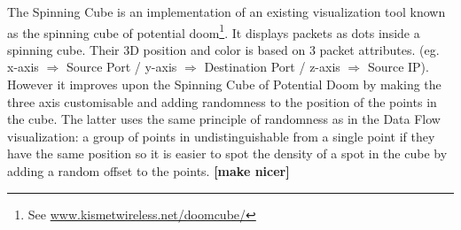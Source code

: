 The Spinning Cube is an implementation of an existing visualization tool known as the spinning cube of potential doom\footnote{See \url{www.kismetwireless.net/doomcube/}}.
It displays packets as dots inside a spinning cube. Their 3D position and color is based on 3 packet attributes. (eg. x-axis $\Rightarrow$ Source Port / y-axis $\Rightarrow$ Destination Port / z-axis $\Rightarrow$ Source IP). 
However it improves upon the Spinning Cube of Potential Doom by making the three axis customisable and adding randomness to the position of the points in the cube. 
The latter uses the same principle of randomness as in the Data Flow visualization: a group of points in undistinguishable from a single point if they have the same position so it is easier to spot the density of a spot in the cube by adding a random offset to the points.
\textbf{[make nicer]}
